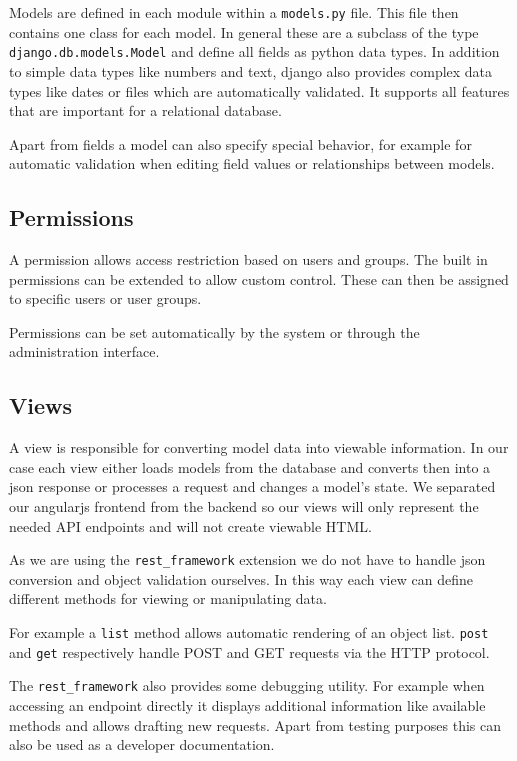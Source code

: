 Models are defined in each module within a \texttt{models.py} file. This
file then contains one class for each model. In general these are a
subclass of the type \texttt{django.db.models.Model} and define all
fields as python data types. In addition to simple data types like
numbers and text, django also provides complex data types like dates or
files which are automatically validated. It supports all features that
are important for a relational database.

Apart from fields a model can also specify special behavior, for example
for automatic validation when editing field values or relationships
between models.

\subsection{Permissions}\label{permissions}

A permission allows access restriction based on users and groups. The
built in permissions can be extended to allow custom control. These can
then be assigned to specific users or user groups.

Permissions can be set automatically by the system or through the
administration interface.

\subsection{Views}\label{views-1}

A view is responsible for converting model data into viewable
information. In our case each view either loads models from the database
and converts then into a json response or processes a request and
changes a model's state. We separated our angularjs frontend from the
backend so our views will only represent the needed API endpoints and
will not create viewable HTML.

As we are using the \texttt{rest\_framework} extension we do not have to
handle json conversion and object validation ourselves. In this way each
view can define different methods for viewing or manipulating data.

For example a \texttt{list} method allows automatic rendering of an
object list. \texttt{post} and \texttt{get} respectively handle POST and
GET requests via the HTTP protocol.

The \texttt{rest\_framework} also provides some debugging utility. For
example when accessing an endpoint directly it displays additional
information like available methods and allows drafting new requests.
Apart from testing purposes this can also be used as a developer
documentation.

